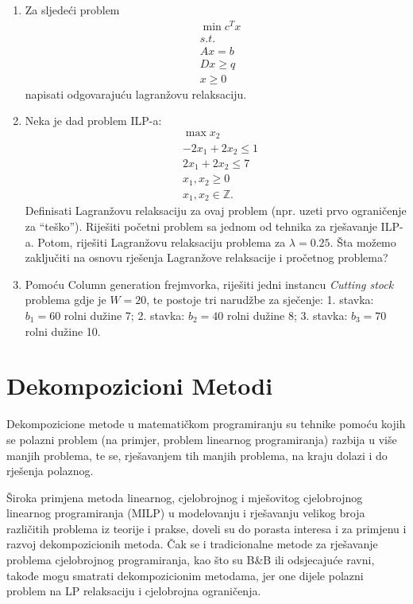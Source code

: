 \documentclass[a4paper, utf8, 11pt, colorlinks]{book}
\begin{document}
\begin{enumerate}
\item  Za sljedeći problem 
\begin{align*}
	&\min c^T x \\
	&s.t. \\
	& Ax = b \\
	& D x \geq q \\
	& x \geq 0
\end{align*}
napisati odgovarajuću lagranžovu relaksaciju. 
\item %
Neka je dad problem ILP-a:
\begin{align*}
	&\max x_2 \\
	& -2x_1 + 2x_2 \leq 1 \\
	& 2 x_1 + 2 x_2 \leq 7 \\
	& x_1, x_2 \geq 0 \\
	& x_1, x_2 \in \mathbb{Z}.
\end{align*}
Definisati Lagranžovu relaksaciju za ovaj problem (npr. uzeti prvo ograničenje za ``teško''). Riješiti početni problem sa jednom od tehnika za rješavanje ILP-a. Potom, riješiti Lagranžovu relaksaciju problema za $\lambda=0.25$. Šta možemo zaključiti na osnovu rješenja Lagranžove relaksacije i pročetnog problema? 
\item   Pomoću Column generation frejmvorka, riješiti jedni instancu \emph{Cutting stock} problema gdje je  
$W = 20$, te postoje tri narudžbe za sječenje: 1. stavka: $b_1=60$ rolni dužine 7; 2. stavka: $b_2=40$ rolni dužine 8; 3. stavka: $b_3=70$ rolni dužine 10. 

 \end{enumerate}
 
 \newpage
 
 \chapter{Dekompozicioni Metodi}
 
Dekompozicione metode u matematičkom programiranju su tehnike pomoću kojih se polazni problem (na primjer, problem linearnog programiranja) razbija u više manjih problema, te se, rješavanjem tih manjih problema, na kraju dolazi i do rješenja polaznog.

Široka primjena metoda linearnog, cjelobrojnog i mješovitog cjelobrojnog linearnog programiranja (MILP) u modelovanju i rješavanju velikog broja različitih problema iz teorije i prakse, doveli su do porasta interesa i za primjenu i razvoj dekompozicionih metoda. Čak se i tradicionalne metode za rješavanje problema cjelobrojnog programiranja, kao što su B\&B  ili odsjecajuće ravni, takođe   mogu smatrati dekompozicionim metodama, jer one dijele polazni problem na LP relaksaciju i cjelobrojna ograničenja.
\end{document}
